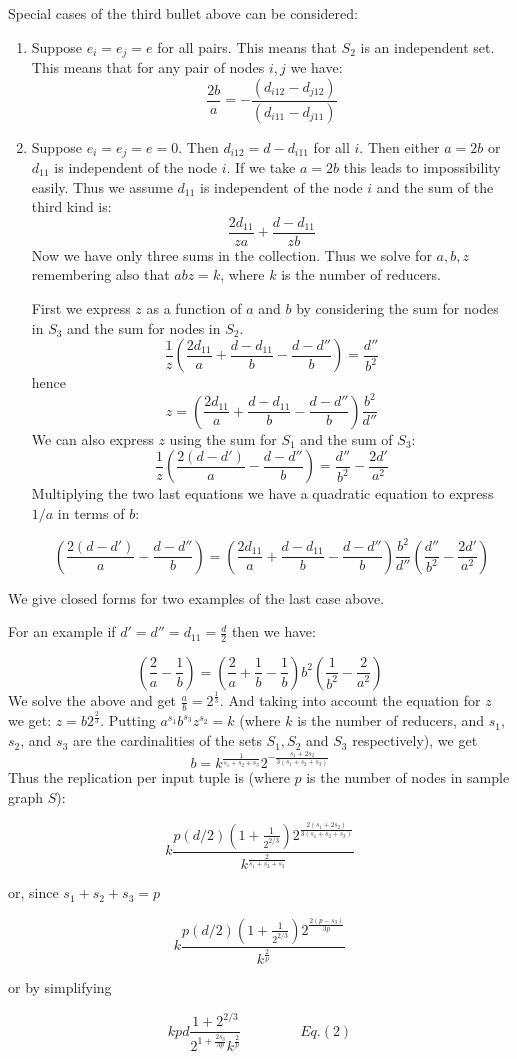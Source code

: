 Special cases of the third bullet above can be considered:
\begin{enumerate}
\item
Suppose $e_i=e_j=e$ for all pairs. This means that $S_2$ is an independent set.
This means that for any pair of nodes $i,j$ we have:
$$\frac{2b}{a}=- \frac{(d_{i12}-d_{j12})}{(d_{i11}-d_{j11}) }$$
\item Suppose $e_i=e_j=e=0$. Then  $d_{i12}=d-d_{i11}$ for all $i$.
Then either $a=2b$ or $d_{11}$ is independent of the node $i$.
If we take $a=2b$ this leads to impossibility easily.
Thus we assume $d_{11}$ is independent of the node $i$ and the sum of the third kind
is:
$$\frac{2d_{11}}{za}+ \frac{d-d_{11}}{zb}$$
Now we have only three sums in the collection. Thus we solve for $a,b,z$
remembering also that $abz=k$, where $k$ is the number of reducers.

First we express $z$ as a function of $a$ and $b$
by considering the sum for nodes in $S_3$ and the sum for nodes in $S_2$.
$$\frac{1}{z}(\frac{2d_{11}}{a}+\frac{d-d_{11}}{b}-\frac{d-d''}{b})=\frac{d''}{b^2}$$
hence
$$z= (\frac{2d_{11}}{a}+\frac{d-d_{11}}{b}-\frac{d-d''}{b})\frac{b^2}{d''}$$
We can also express $z$ using the sum for $S_1$ and the sum of $S_3$:
$$\frac{1}{z}(\frac{2 (d-d')}{a}-\frac{d-d''}{b})=\frac{d''}{b^2}-\frac{2d'}{a^2}$$
Multiplying the two last equations we have a quadratic equation to express $1/a$ in terms of $b$:

$$(\frac{2 (d-d')}{a}-\frac{d-d''}{b})=(\frac{2d_{11}}{a}+\frac{d-d_{11}}{b}-\frac{d-d''}{b})\frac{b^2}{d''}(\frac{d''}{b^2}-\frac{2d'}{a^2})$$
\end{enumerate}
We give closed forms for two examples of the last case above.


\begin{example}
For an example if $d'=d''=d_{11}=\frac{d}{2}$ then we have:

$$(\frac{2 }{a}-\frac{1}{b})=(\frac{2}{a}+\frac{1}{b}-\frac{1}{b})b^2(\frac{1}{b^2}-\frac{2}{a^2})$$
We solve the above and get $\frac{a}{b}=2^{\frac{1}{3}}$. And taking into account the equation for $z$ we get: $z=b2^{\frac{2}{3}}$.
Putting $a^{s_1}b^{s_3}z^{s_2}=k$ (where $k$ is the number of reducers, and $s_1$, $s_2$, and $s_3$ are the cardinalities of the
sets  $S_1,S_2$ and $S_3$ respectively), we get $$b=k^{\frac{1}{s_1+s_2+s_3}}2^{-\frac{s_1+2s_2}{3(s_1+s_2+s_3)}}$$
Thus the replication per input tuple is (where $p$ is the number of nodes in sample graph $S$):

$$k\frac{p(d/2)(1+\frac{1}{2^{2/3}})2^{\frac{2(s_1+2s_2)}{3(s_1+s_2+s_3)}}}{k^{\frac{2}{s_1+s_2+s_3}}}$$

or, since $s_1+s_2+s_3=p$

$$k\frac{p(d/2)(1+\frac{1}{2^{2/3}})2^{\frac{2(p-s_3)}{3p}}}{k^{\frac{2}{p}}}$$

or by simplifying

$$kpd\frac{1+2^{2/3}}{2^{1+\frac{2s_3}{3p}}k^{\frac{2}{p}}}~~~~~~~~~~~~~~~~~~~Eq. (2)$$
\end{example}

